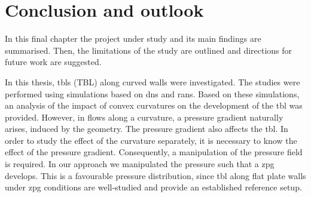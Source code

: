 \chapter{Conclusion and outlook} \label{chap:summary}

In this final chapter the project under study and its main findings are summarised.
Then, the limitations of the study are outlined and directions for future work are suggested. 

In this thesis, \acrlong{tbl}s (TBL) along curved walls were investigated.
The studies were performed using simulations based on \acrfull{dns} and \acrfull{rans}.
Based on these simulations, an analysis of the impact of convex curvatures on the development of the \acrlong{tbl} was provided.
However, in flows along a curvature, a pressure gradient naturally arises, induced by the geometry.
The pressure gradient also affects the \acrlong{tbl}.
In order to study the effect of the curvature separately,  it is necessary to know the effect of the pressure gradient.
Consequently, a manipulation of the pressure field is required.
In our approach we manipulated the pressure such that a \acrfull{zpg} develops.
This is a favourable pressure distribution, since \acrlong{tbl} along flat plate walls under \acrlong{zpg} conditions are well-studied and provide an established reference setup.


